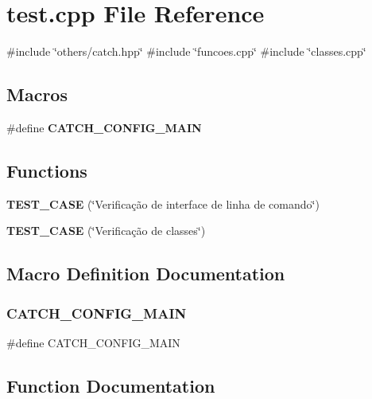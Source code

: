 \section{test.\+cpp File Reference}
\label{test_8cpp}
{\ttfamily \#include \char`\"{}others/catch.\+hpp\char`\"{}}\newline
{\ttfamily \#include \char`\"{}funcoes.\+cpp\char`\"{}}\newline
{\ttfamily \#include \char`\"{}classes.\+cpp\char`\"{}}\newline
\subsection*{Macros}
\begin{DoxyCompactItemize}
\item 
\#define \textbf{ C\+A\+T\+C\+H\+\_\+\+C\+O\+N\+F\+I\+G\+\_\+\+M\+A\+IN}
\end{DoxyCompactItemize}
\subsection*{Functions}
\begin{DoxyCompactItemize}
\item 
\textbf{ T\+E\+S\+T\+\_\+\+C\+A\+SE} (\char`\"{}Verificação de interface de linha de comando\char`\"{})
\item 
\textbf{ T\+E\+S\+T\+\_\+\+C\+A\+SE} (\char`\"{}Verificação de classes\char`\"{})
\end{DoxyCompactItemize}


\subsection{Macro Definition Documentation}
\mbox{\label{test_8cpp_a656eb5868e824d59f489f910db438420}} 
\subsubsection{C\+A\+T\+C\+H\+\_\+\+C\+O\+N\+F\+I\+G\+\_\+\+M\+A\+IN}
{\footnotesize\ttfamily \#define C\+A\+T\+C\+H\+\_\+\+C\+O\+N\+F\+I\+G\+\_\+\+M\+A\+IN}



\subsection{Function Documentation}
\mbox{\label{test_8cpp_a0b3081beade6a7cfd4713afb020dccdc}} 
